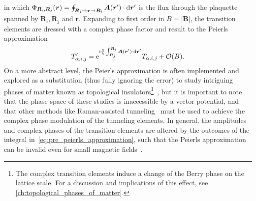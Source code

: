 in which $\Phi_{\bm R_i,\bm R_j}(\bm r) = \oint_{\bm R_j\rightarrow\bm r\rightarrow\bm R_i}\bm A(\bm r')\cdot\mathrm d \bm r'$ is the flux through the plaquette spanned by $\bm R_i, \bm R_j$ and $\bm r$.
Expanding to first order in $B=|\bm B|$, the transition elements are dressed with a complex phase factor and result to the Peierls approximation
\begin{align}
    T_{\alpha,i,j}'=\mathrm e^{\mathrm i\frac q\hbar\int_{\bm R_j}^{\bm R_i}\bm A(\bm r')\cdot\mathrm d\bm r'}T_{\alpha,i,j}+\mathcal O(B).
    \label{eq:peierls_substitution}
\end{align}
On a more abstract level, the Peierls approximation is often implemented and explored as a substitution (thus fully ignoring the error) to study intriguing phases of matter known as topological insulators\footnote{The complex transition elements induce a change of the Berry phase on the lattice scale. For a discussion and implications of this effect, see \cref{ch:topological_phases_of_matter}.}~\cite{Ozawa20192}, but it is important to note that the phase space of these studies is inaccessible by a vector potential, and that other methods like Raman-assisted tunneling~\cite{Garcia2012} must be used to achieve the complex phase modulation of the tunneling elements.
In general, the amplitudes and complex phases of the transition elements are altered by the outcomes of the integral in~\cref{eq:pre_peierls_approximation}, such that the Peierls approximation can be invalid even for small magnetic fields~\cite{Alexandrov1991,Julen2014}.

